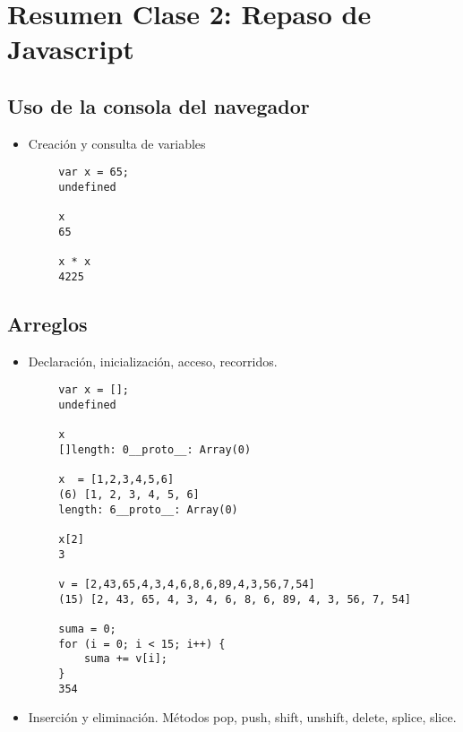 \hypertarget{resumen-clase-2-repaso-de-javascript}{%
\section{Resumen Clase 2: Repaso de
Javascript}\label{resumen-clase-2-repaso-de-javascript}}

\hypertarget{uso-de-la-consola-del-navegador}{%
\subsection{Uso de la consola del
navegador}\label{uso-de-la-consola-del-navegador}}

\begin{itemize}
\tightlist
\item
  Creación y consulta de variables
\end{itemize}

\begin{verbatim}
        var x = 65;
        undefined

        x
        65

        x * x
        4225
\end{verbatim}

\hypertarget{arreglos}{%
\subsection{Arreglos}\label{arreglos}}

\begin{itemize}
\tightlist
\item
  Declaración, inicialización, acceso, recorridos.
\end{itemize}

\begin{verbatim}
        var x = [];
        undefined

        x
        []length: 0__proto__: Array(0)

        x  = [1,2,3,4,5,6]
        (6) [1, 2, 3, 4, 5, 6]
        length: 6__proto__: Array(0)

        x[2]
        3

        v = [2,43,65,4,3,4,6,8,6,89,4,3,56,7,54]
        (15) [2, 43, 65, 4, 3, 4, 6, 8, 6, 89, 4, 3, 56, 7, 54]

        suma = 0; 
        for (i = 0; i < 15; i++) { 
            suma += v[i]; 
        }
        354
\end{verbatim}

\begin{itemize}
\tightlist
\item
  Inserción y eliminación. Métodos pop, push, shift, unshift, delete,
  splice, slice.
\end{itemize}

